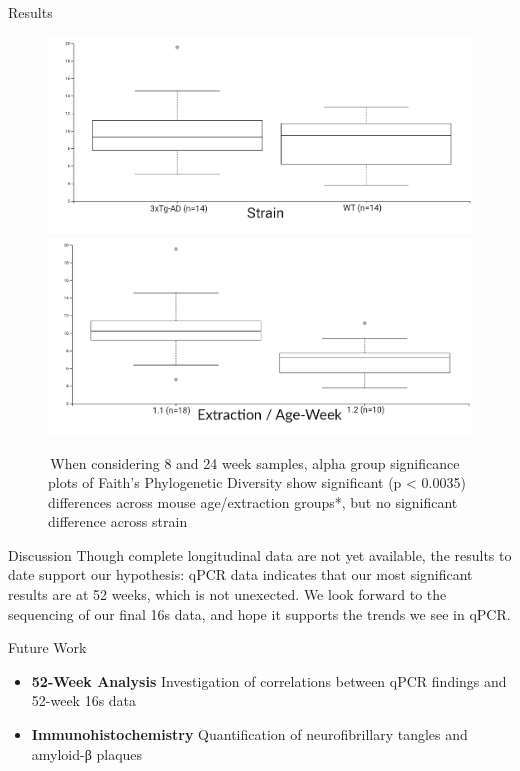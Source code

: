 \documentclass[final]{beamer}
\newlength{\colwidth}
\begin{document}
\begin{frame}[t]
\begin{columns}[t]
\begin{column}{\colwidth}
\begin{block}{Results}
  \begin{figure}[tph!]
    {\includegraphics[width=.75\linewidth]{assets/faith_pd_group_sig_strain}}
    {\includegraphics[width=.75\linewidth]{assets/faith_pd_group_sig_extraction}}
      \caption{\,When considering 8 and 24 week samples, alpha group
      significance plots of Faith's Phylogenetic Diversity show significant
      (p < 0.0035) differences across mouse age/extraction groups*, but no
      significant difference across strain}
      \label{fig:faith_strain}
    \end{figure}

  \end{block}

  \begin{block}{Discussion}
    Though complete longitudinal data are not yet available, the results
    to date support our hypothesis: qPCR data indicates that our most
    significant results are at 52 weeks, which is not unexected. We look
    forward to the sequencing of our final 16s data, and hope it supports the
    trends we see in qPCR.
  \end{block}

  \begin{block}{Future Work}

    \begin{itemize}
      \item \textbf{52-Week Analysis} Investigation of correlations between qPCR findings and 52-week 16s data
      \item \textbf{Immunohistochemistry} Quantification of neurofibrillary tangles and amyloid-β plaques
    \end{itemize}


\end{block}
\end{column}
\end{columns}
\end{frame}
\end{document}
